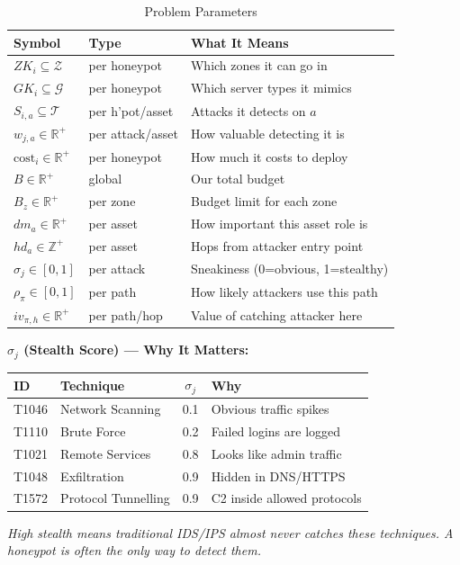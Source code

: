 \documentclass[journal]{IEEEtran}
\newcommand{\calT}{\mathcal{T}}
\newcommand{\calZ}{\mathcal{Z}}
\newcommand{\calG}{\mathcal{G}}
\begin{document}
\begin{table}[htbp]
\caption{Problem Parameters}
\label{tab:params}
\centering
\renewcommand{\arraystretch}{1.2}
\begin{tabular}{@{}lll@{}}
\toprule
\textbf{Symbol} & \textbf{Type} & \textbf{What It Means} \\
\midrule
$ZK_i \subseteq \calZ$        & per honeypot   & Which zones it can go in \\
$GK_i \subseteq \calG$        & per honeypot   & Which server types it mimics \\
$S_{i,a} \subseteq \calT$     & per h'pot/asset& Attacks it detects on $a$ \\
$w_{j,a} \in \mathbb{R}^+$    & per attack/asset& How valuable detecting it is \\
$\mathrm{cost}_i \in \mathbb{R}^+$ & per honeypot & How much it costs to deploy \\
$B \in \mathbb{R}^+$          & global         & Our total budget \\
$B_z \in \mathbb{R}^+$        & per zone       & Budget limit for each zone \\
$dm_a \in \mathbb{R}^+$       & per asset      & How important this asset role is \\
$hd_a \in \mathbb{Z}^+$       & per asset      & Hops from attacker entry point \\
$\sigma_j \in [0,1]$          & per attack     & Sneakiness (0=obvious, 1=stealthy) \\
$\rho_\pi \in [0,1]$          & per path       & How likely attackers use this path \\
$iv_{\pi,h} \in \mathbb{R}^+$ & per path/hop   & Value of catching attacker here \\
\bottomrule
\end{tabular}
\end{table}

\begin{examplebox}
\textbf{$\sigma_j$ (Stealth Score) --- Why It Matters:}
\begin{center}
\small
\renewcommand{\arraystretch}{1.1}
\begin{tabular}{@{}llcl@{}}
\toprule
\textbf{ID} & \textbf{Technique} & $\sigma_j$ & \textbf{Why} \\
\midrule
T1046 & Network Scanning    & 0.1 & Obvious traffic spikes \\
T1110 & Brute Force         & 0.2 & Failed logins are logged \\
T1021 & Remote Services     & 0.8 & Looks like admin traffic \\
T1048 & Exfiltration        & 0.9 & Hidden in DNS/HTTPS \\
T1572 & Protocol Tunnelling & 0.9 & C2 inside allowed protocols \\
\bottomrule
\end{tabular}
\end{center}
\textit{High stealth means traditional IDS/IPS almost never
catches these techniques.
A honeypot is often the \emph{only} way to detect them.}
\end{examplebox}
\end{document}
